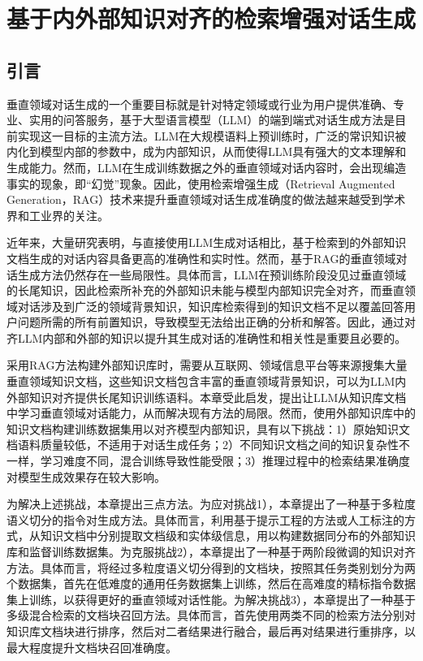 \chapter{基于内外部知识对齐的检索增强对话生成}

\section{引言}

垂直领域对话生成的一个重要目标就是针对特定领域或行业为用户提供准确、专业、实用的问答服务，基于大型语言模型（LLM）的端到端式对话生成方法是目前实现这一目标的主流方法。LLM在大规模语料上预训练时，广泛的常识知识被内化到模型内部的参数中，成为内部知识，从而使得LLM具有强大的文本理解和生成能力。然而，LLM在生成训练数据之外的垂直领域对话内容时，会出现编造事实的现象，即“幻觉”现象。因此，使用检索增强生成（Retrieval Augmented Generation，RAG）\cite{DBLP:conf/nips/LewisPPPKGKLYR020}技术来提升垂直领域对话生成准确度的做法越来越受到学术界和工业界的关注。

近年来，大量研究\cite{DBLP:journals/corr/abs-2312-10997}表明，与直接使用LLM生成对话相比，基于检索到的外部知识文档生成的对话内容具备更高的准确性和实时性。然而，基于RAG的垂直领域对话生成方法仍然存在一些局限性。具体而言，LLM在预训练阶段没见过垂直领域的长尾知识，因此检索所补充的外部知识未能与模型内部知识完全对齐，而垂直领域对话涉及到广泛的领域背景知识，知识库检索得到的知识文档不足以覆盖回答用户问题所需的所有前置知识，导致模型无法给出正确的分析和解答。因此，通过对齐LLM内部和外部的知识以提升其生成对话的准确性和相关性是重要且必要的。

采用RAG方法构建外部知识库时，需要从互联网、领域信息平台等来源搜集大量垂直领域知识文档，这些知识文档包含丰富的垂直领域背景知识，可以为LLM内外部知识对齐提供长尾知识训练语料。本章受此启发，提出让LLM从知识库文档中学习垂直领域对话能力，从而解决现有方法的局限。然而，使用外部知识库中的知识文档构建训练数据集用以对齐模型内部知识，具有以下挑战：1）原始知识文档语料质量较低，不适用于对话生成任务；2）不同知识文档之间的知识复杂性不一样，学习难度不同，混合训练导致性能受限；3）推理过程中的检索结果准确度对模型生成效果存在较大影响。

为解决上述挑战，本章提出三点方法。为应对挑战1），本章提出了一种基于多粒度语义切分的指令对生成方法。具体而言，利用基于提示工程的方法或人工标注的方式，从知识文档中分别提取文档级和实体级信息，用以构建数据同分布的外部知识库和监督训练数据集。为克服挑战2），本章提出了一种基于两阶段微调的知识对齐方法。具体而言，将经过多粒度语义切分得到的文档块，按照其任务类别划分为两个数据集，首先在低难度的通用任务数据集上训练，然后在高难度的精标指令数据集上训练，以获得更好的垂直领域对话性能。为解决挑战3），本章提出了一种基于多级混合检索的文档块召回方法。具体而言，首先使用两类不同的检索方法分别对知识库文档块进行排序，然后对二者结果进行融合，最后再对结果进行重排序，以最大程度提升文档块召回准确度。

